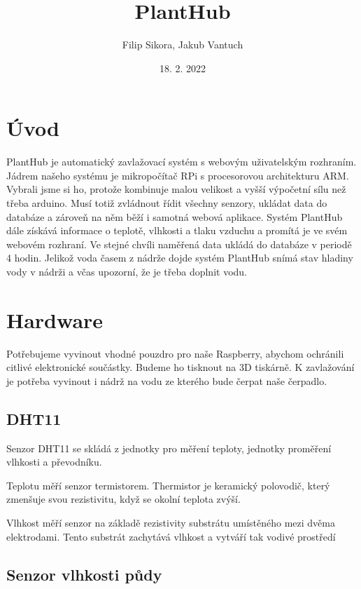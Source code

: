 \documentclass[11pt,a4paper]{article}
\title{PlantHub}
\author{Filip Sikora, Jakub Vantuch}
\date{18. 2. 2022}
\begin{document}
\begin{titlingpage}
	\maketitle
\end{titlingpage}

\section*{Úvod}

PlantHub je automatický zavlažovací systém s webovým uživatelským rozhraním. Jádrem našeho systému je mikropočítač RPi s procesorovou architekturu ARM. Vybrali jsme si ho, protože kombinuje malou velikost a vyšší výpočetní sílu než třeba arduino. Musí totiž zvládnout řídit všechny senzory, ukládat data do databáze a zároveň na něm běží i samotná webová aplikace. Systém PlantHub dále získává informace o teplotě, vlhkosti a tlaku vzduchu a promítá je ve svém webovém rozhraní. Ve stejné chvíli naměřená data ukládá do databáze v periodě 4 hodin. Jelikož voda časem z nádrže dojde systém PlantHub snímá stav hladiny vody v nádrži a včas upozorní, že je třeba doplnit vodu.

\section*{Hardware}

Potřebujeme vyvinout vhodné pouzdro pro naše Raspberry, abychom ochránili citlivé elektronické součástky. Budeme ho tisknout na 3D tiskárně. K zavlažování je potřeba vyvinout i nádrž na vodu ze kterého bude čerpat naše čerpadlo.

\subsection*{DHT11}

Senzor DHT11 se skládá z jednotky pro měření teploty, jednotky proměření vlhkosti a převodníku.

Teplotu měří senzor termistorem. Thermistor je keramický polovodič, který zmenšuje svou rezistivitu, když se okolní teplota zvýší.

Vlhkost měří senzor na základě rezistivity substrátu umístěného mezi dvěma elektrodami. Tento substrát zachytává vlhkost a vytváří tak vodivé prostředí

\subsection*{Senzor vlhkosti půdy}
\end{document}
